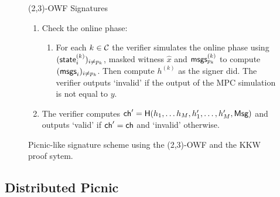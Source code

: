 \begin{figure}[p]
\begin{minipage}[t]{1.1\textwidth}
\begin{protocolbox}{(2,3)-OWF Signatures}
\begin{description}
\begin{enumerate}
        \item Check the online phase:
        \begin{enumerate}
            \item For each $k \in \mathcal{C}$ the verifier simulates the online phase using $(\textsf{state}^{(k)}_{i})_{i \neq p_k}$,  
                masked witness $\hat{x}$ and $\textsf{msgs}^{(k)}_{p_k}$ to compute $(\textsf{msgs}_i)_{i \neq p_k}$. 
                Then compute $h^{(k)}$ as the signer did. The verifier outputs `invalid' if the output of the MPC simulation is not equal to $y$.
        \end{enumerate}
    \item The verifier computes $\textsf{ch}' = \textsf{H}(h_1, \ldots h_M, h_1', \ldots, h_M', \textsf{Msg})$ and outputs `valid' if $\textsf{ch}' = \textsf{ch}$ and `invalid' otherwise. 
    \end{enumerate}
 \end{description}
 \end{protocolbox}
 \end{minipage}
	\vspace*{-10pt}
	\caption{\label{fig:23-picnic}Picnic-like signature scheme using the (2,3)-OWF and the KKW proof sytem.} 
\end{figure}


\subsection{Distributed Picnic}
